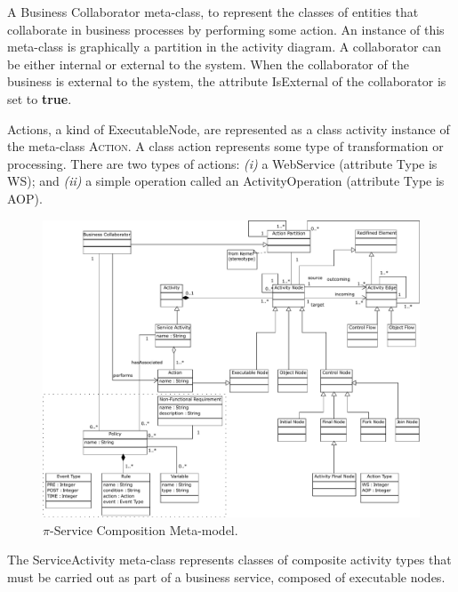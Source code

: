 \documentclass{singlecol-new}
\theoremstyle{TH}{
\newtheorem{lemma}{Lemma}
\newtheorem{theorem}[lemma]{Theorem}
\newtheorem{corrolary}[lemma]{Corrolary}
\newtheorem{conjecture}[lemma]{Conjecture}
\newtheorem{proposition}[lemma]{Proposition}
\newtheorem{claim}[lemma]{Claim}
\newtheorem{stheorem}[lemma]{Wrong Theorem}
\newtheorem{algorithm}{Algorithm}
}
\theoremstyle{THrm}{
\newtheorem{definition}{Definition}[section]
\newtheorem{question}{Question}[section]
\newtheorem{remark}{Remark}
\newtheorem{scheme}{Scheme}
}
\theoremstyle{THhit}{
\newtheorem{case}{Case}[section]
}
\theoremstyle{THhsl}{
\newtheorem{example}{Example}
}
\begin{document}
\begin{compactitem}
\item A {\sc Business Collaborator} meta-class, to represent the classes of entities that collaborate in  business processes by performing some  action.
An instance of this meta-class is graphically a partition in the activity diagram.
A collaborator can be either internal or external to the system.
When the collaborator of the business is external to the system, the attribute {\sf IsExternal} of the collaborator is set to \textbf{true}.


\item {\sc Action}s, a kind of {\sc ExecutableNode}, are represented as a class activity instance of the meta-class \textsc{Action}.
A class action represents some type of transformation or processing.
There are two types of actions: \textit{(i)} a WebService (attribute Type is {\sf WS}); and \textit{(ii)} a simple operation called an {\sc ActivityOperation} (attribute Type is {\sc AOP}).

\begin{figure}[h]
\centering
\includegraphics[width=1\textwidth]{./figures/PiServiceComposition}
\caption{$\pi$-Service Composition Meta-model.}
\label{fig:e-scomposition-metamodel}
\end{figure}

\item The {\sc ServiceActivity} meta-class represents classes of composite activity types that must be carried out as part of a business service,  composed of  execu\-ta\-ble nodes.


\end{compactitem}
\end{document}
